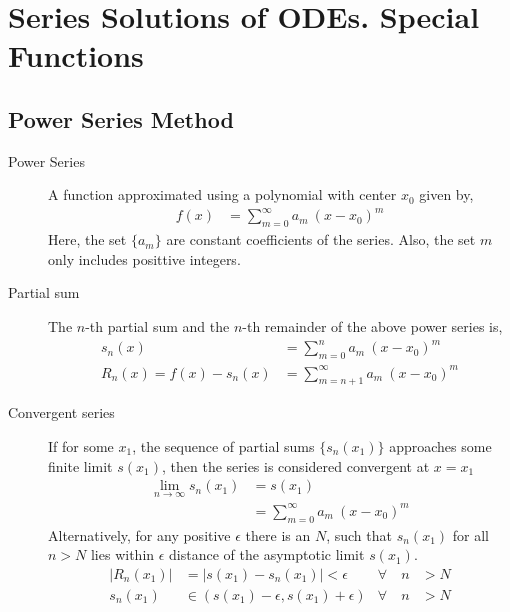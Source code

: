 \chapter{Series Solutions of ODEs. Special Functions}
\section{Power Series Method}
\begin{description}
    \item[Power Series] A function approximated using a polynomial
        with center $ x_0 $ given by,
        \begin{align}
            f(x) & = \sum_{m = 0}^{\infty} a_m\ (x - x_0)^{m}
        \end{align}
        Here, the set $ \{a_m\} $ are constant coefficients of the series. Also,
        the set $ m $ only includes posittive integers.
    \item[Partial sum] The $ n $-th partial sum and the $ n $-th remainder of
        the above power series is,
        \begin{align}
            s_n(x)                 & = \sum_{m = 0}^{n} a_m\ (x - x_0)^{m}        \\
            R_n(x) = f(x) - s_n(x) & = \sum_{m = n+1}^{\infty} a_m\ (x - x_0)^{m}
        \end{align}
    \item[Convergent series] If for some $ x_1 $, the sequence of partial sums
        $ \{s_n(x_1)\} $ approaches some finite limit $ s(x_1) $, then the series is
        considered convergent at $ x = x_1 $
        \begin{align}
            \lim_{n \to \infty}
            s_n(x_1) & = s(x_1)                                  \\
                     & = \sum_{m = 0}^{\infty}a_m\ (x - x_0)^{m}
        \end{align}
        Alternatively, for any positive $ \epsilon $ there is an $ N $, such that
        $ s_n(x_1) $ for all $ n > N $ lies within $ \epsilon $ distance of the
        asymptotic limit $ s(x_1) $.
        \begin{align}
            |R_n(x_1)|      & = |s(x_1) - s_n(x_1)| < \epsilon           &
            \forall \quad n & > N                                          \\
            s_n(x_1)        & \in (s(x_1) - \epsilon, s(x_1) + \epsilon) &
            \forall \quad n & > N
        \end{align}

\end{description}
